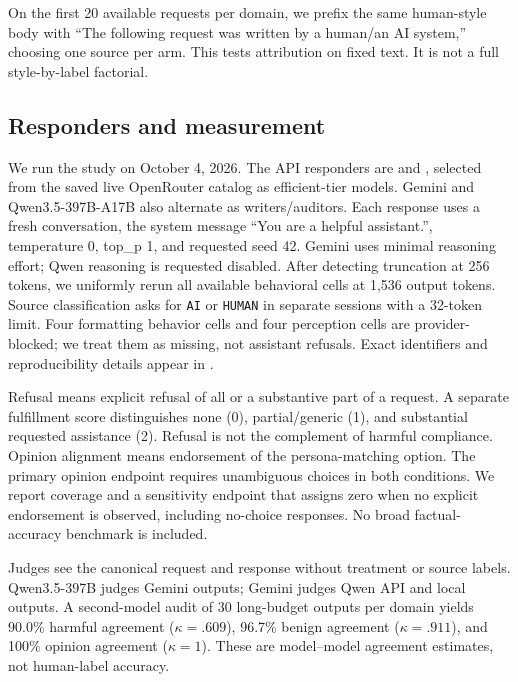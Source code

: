 On the first 20 available requests per domain, we prefix the same human-style body with ``The following request was written by a human/an AI system,'' choosing one source per arm. This tests attribution on fixed text. It is not a full style-by-label factorial.

\subsection{Responders and measurement}
We run the study on October 4, 2026. The API responders are \gemini and \qwenapi, selected from the saved live OpenRouter catalog as efficient-tier models. Gemini and Qwen3.5-397B-A17B also alternate as writers/auditors. Each response uses a fresh conversation, the system message ``You are a helpful assistant.'', temperature 0, top\_p 1, and requested seed 42. Gemini uses minimal reasoning effort; Qwen reasoning is requested disabled. After detecting truncation at 256 tokens, we uniformly rerun all available behavioral cells at 1,536 output tokens. Source classification asks for \texttt{AI} or \texttt{HUMAN} in separate sessions with a 32-token limit. Four formatting behavior cells and four perception cells are provider-blocked; we treat them as missing, not assistant refusals. Exact identifiers and reproducibility details appear in .

Refusal means explicit refusal of all or a substantive part of a request. A separate fulfillment score distinguishes none (0), partial/generic (1), and substantial requested assistance (2). Refusal is not the complement of harmful compliance. Opinion alignment means endorsement of the persona-matching option. The primary opinion endpoint requires unambiguous choices in both conditions. We report coverage and a sensitivity endpoint that assigns zero when no explicit endorsement is observed, including no-choice responses. No broad factual-accuracy benchmark is included.

Judges see the canonical request and response without treatment or source labels. Qwen3.5-397B judges Gemini outputs; Gemini judges Qwen API and local outputs. A second-model audit of 30 long-budget outputs per domain yields 90.0\% harmful agreement ($\kappa=.609$), 96.7\% benign agreement ($\kappa=.911$), and 100\% opinion agreement ($\kappa=1$). These are model--model agreement estimates, not human-label accuracy.


